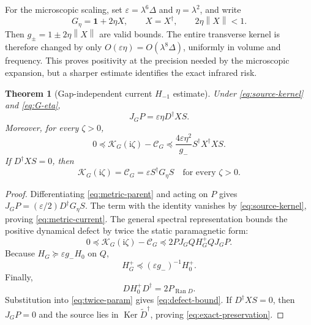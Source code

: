 \documentclass[11pt]{article}
\newtheorem{theorem}{Theorem}[section]
\theoremstyle{definition}
\theoremstyle{remark}
\newcommand{\cK}{\mathcal K}
\newcommand{\cC}{\mathcal C}
\newcommand{\Id}{\mathbf 1}
\newcommand{\Ker}{\operatorname{Ker}}
\newcommand{\Ran}{\operatorname{Ran}}
\newcommand{\I}{\mathrm i}
\newcommand{\norm}[1]{\left\lVert #1\right\rVert}
\newcommand{\eps}{\varepsilon}
\begin{document}
For the microscopic scaling, set $\eps=\lambda^6\Delta$ and
$\eta=\lambda^2$, and write
\begin{equation}
 G_\eta=\Id+2\eta X,
 \qquad X=X^\dagger,
 \qquad 2\eta\norm X<1.
 \label{eq:G-eta}
\end{equation}
Then $g_\pm=1\pm2\eta\norm X$ are valid bounds.  The entire transverse kernel
is therefore changed by only $O(\eps\eta)=O(\lambda^8\Delta)$, uniformly in
volume and frequency.  This proves positivity at the precision needed by the
microscopic expansion, but a sharper estimate identifies the exact infrared
risk.

\begin{theorem}[Gap-independent current $H_{-1}$ estimate]
\label{thm:hminusone}
Under \eqref{eq:source-kernel} and \eqref{eq:G-eta},
\begin{equation}
 J_G P
 =\eps\eta D^\dagger XS.
 \label{eq:metric-current}
\end{equation}
Moreover, for every $\zeta>0$,
\begin{equation}
 \boxed{
 0\preceq \cK_G(\I\zeta)-\cC_G
 \preceq
 \frac{4\eps\eta^2}{g_-}
 S^\dagger X^\dagger XS.}
 \label{eq:defect-bound}
\end{equation}
If $D^\dagger XS=0$, then
\begin{equation}
 \cK_G(\I\zeta)=\cC_G=\eps S^\dagger G_\eta S
 \quad\text{for every }\zeta>0.
 \label{eq:exact-preservation}
\end{equation}
\end{theorem}

\begin{proof}
Differentiating \eqref{eq:metric-parent} and acting on $P$ gives
$J_GP=(\eps/2)D^\dagger G_\eta S$.  The term with the identity vanishes by
\eqref{eq:source-kernel}, proving \eqref{eq:metric-current}.  The general
spectral representation bounds the positive dynamical defect by twice the
static paramagnetic form:
\begin{equation}
 0\preceq\cK_G(\I\zeta)-\cC_G
 \preceq2PJ_GQH_G^+QJ_GP.
 \label{eq:twice-param}
\end{equation}
Because $H_G\succeq\eps g_-H_0$ on $Q$,
\begin{equation}
 H_G^+\preceq(\eps g_-)^{-1}H_0^+.
\end{equation}
Finally,
\begin{equation}
 DH_0^+D^\dagger=2P_{\Ran D}.
 \label{eq:partial-isometry}
\end{equation}
Substitution into \eqref{eq:twice-param} gives
\eqref{eq:defect-bound}.  If $D^\dagger XS=0$, then $J_GP=0$ and the source
lies in $\Ker\widetilde D^\dagger$, proving \eqref{eq:exact-preservation}.
\end{proof}
\end{document}
